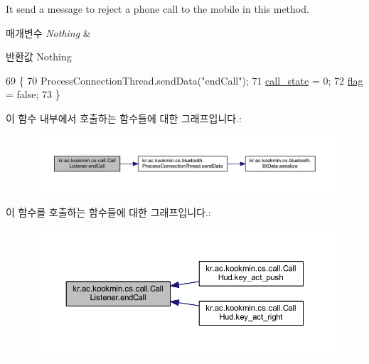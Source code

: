 It send a message to reject a phone call to the mobile in this method. 


\begin{DoxyParams}{매개변수}
{\em Nothing} & \\
\hline
\end{DoxyParams}
\begin{DoxyReturn}{반환값}
Nothing 
\end{DoxyReturn}

\begin{DoxyCode}
69                               \{
70     ProcessConnectionThread.sendData(\textcolor{stringliteral}{"endCall"});
71     \hyperlink{classkr_1_1ac_1_1kookmin_1_1cs_1_1call_1_1_call_listener_a03420a995d78c4421f4fe92b75be5647}{call\_state} = 0;
72     \hyperlink{classkr_1_1ac_1_1kookmin_1_1cs_1_1call_1_1_call_listener_a43a92315d34bbf897048aea788679fbc}{flag} = \textcolor{keyword}{false};
73   \}
\end{DoxyCode}


이 함수 내부에서 호출하는 함수들에 대한 그래프입니다.\+:\nopagebreak
\begin{figure}[H]
\begin{center}
\leavevmode
\includegraphics[width=350pt]{classkr_1_1ac_1_1kookmin_1_1cs_1_1call_1_1_call_listener_a8b9c6d3b52e1fe1e080f265eed49f0a9_cgraph}
\end{center}
\end{figure}




이 함수를 호출하는 함수들에 대한 그래프입니다.\+:\nopagebreak
\begin{figure}[H]
\begin{center}
\leavevmode
\includegraphics[width=350pt]{classkr_1_1ac_1_1kookmin_1_1cs_1_1call_1_1_call_listener_a8b9c6d3b52e1fe1e080f265eed49f0a9_icgraph}
\end{center}
\end{figure}


